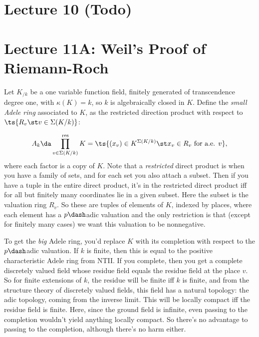 \hypertarget{lecture-10-todo}{%
\section{Lecture 10 (Todo)}\label{lecture-10-todo}}

\hypertarget{lecture-11a-weils-proof-of-riemann-roch}{%
\section{Lecture 11A: Weil's Proof of
Riemann-Roch}\label{lecture-11a-weils-proof-of-riemann-roch}}

Let \(K_{/k}\) be a one variable function field, finitely generated of
transcendence degree one, with \(\kappa(K) = k\), so \(k\) is
algebraically closed in \(K\). Define the \emph{small Adele ring}
associated to \(K\), as the restricted direction product with respect to
\(\ts{R_v \st v\in \Sigma(K/k)}\):

\begin{align*}
A_k \da \prod^{\text{res}}_{v\in \Sigma(K/k)} K
= \ts{(x_v) \in K^{\Sigma(K/k)} \st x_v \in R_v \text{ for a.e. } v }
,\end{align*} where each factor is a copy of \(K\). Note that a
\emph{restricted} direct product is when you have a family of sets, and
for each set you also attach a subset. Then if you have a tuple in the
entire direct product, it's in the restricted direct product iff for all
but finitely many coordinates lie in a given subset. Here the subset is
the valuation ring \(R_v\). So these are tuples of elements of \(K\),
indexed by places, where each element has a \(p\dash\)adic valuation and
the only restriction is that (except for finitely many cases) we want
this valuation to be nonnegative.

\begin{remark}

To get the \emph{big} Adele ring, you'd replace \(K\) with its
completion with respect to the \(p\dash\)adic valuation. If \(k\) is
finite, then this is equal to the positive characteristic Adele ring
from NTII. If you complete, then you get a complete discretely valued
field whose residue field equals the residue field at the place \(v\).
So for finite extensions of \(k\), the residue will be finite iff \(k\)
is finite, and from the structure theory of discretely valued fields,
this field has a natural topology: the adic topology, coming from the
inverse limit. This will be locally compact iff the residue field is
finite. Here, since the ground field is infinite, even passing to the
completion wouldn't yield anything locally compact. So there's no
advantage to passing to the completion, although there's no harm either.

\end{remark}

